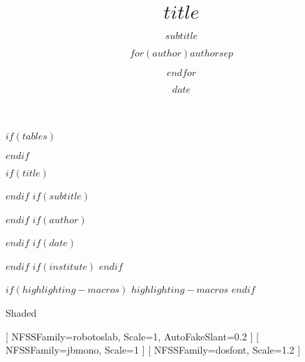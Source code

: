 \usepackage{fontspec}         %
\usepackage[skins]{tcolorbox} %
\usepackage{tikz}             %
\usepackage{calc}             %
\usepackage{beamerbaseframe}
\usepackage{beamerbasemisc}
\usepackage{beamerbasetemplates}
\usetikzlibrary{calc}         %

\usepackage[babelshorthands=true,localmarks=true]{polyglossia}
\setdefaultlanguage{$if(lang)$$lang$$else$en-US$endif$}
\usepackage[
    $if(lang)$$lang$$else$en-US$endif$
]{datetime2}                  %

\usepackage{hyperref} %
\usepackage{ulem}     %
\providecommand{\tightlist}{\setlength{\itemsep}{0pt}\setlength{\parskip}{0pt}}

$if(tables)$
\usepackage{longtable,booktabs,array}
\usepackage{beamerbasetitle}
\usepackage{beamerbasesection}
\usepackage{beamerbaseoverlay}
$endif$


$if(title)$
\title{$title$}
$endif$
$if(subtitle)$
\subtitle{$subtitle$}
$endif$
$if(author)$
\author{$for(author)$$author$$sep$ \and $endfor$}
$endif$
$if(date)$
\date{$date$}
$endif$
$if(institute)$
$endif$

$if(highlighting-macros)$
$highlighting-macros$
$endif$

\ifcsname Shaded\endcsname
\else
    \newenvironment{Shaded}{}{}
\fi
{}

[ %
    NFSSFamily=robotoslab,
    Scale=1,
    AutoFakeSlant=0.2
]
[ %
    NFSSFamily=jbmono,
    Scale=1
]
[ %
    NFSSFamily=dosfont,
    Scale=1.2
]

